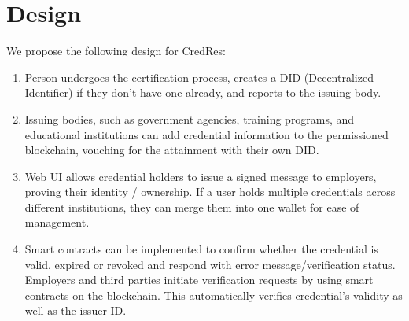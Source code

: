 \section{Design}

We propose the following design for CredRes:
\begin{enumerate}
    \item Person undergoes the certification process, creates a DID (Decentralized Identifier) if they don’t have one already, and reports to the issuing body.
    \item Issuing bodies, such as government agencies, training programs, and educational institutions can add credential information to the permissioned blockchain, vouching for the attainment with their own DID.
    \item Web UI allows credential holders to issue a signed message to employers, proving their identity / ownership. If a user holds multiple credentials across different institutions, they can merge them into one wallet for ease of management.
    \item Smart contracts can be implemented to confirm whether the credential is valid, expired or revoked and respond with error message/verification status. Employers and third parties initiate verification requests by using smart contracts on the blockchain. This automatically verifies credential’s validity as well as the issuer ID.
\end{enumerate}

